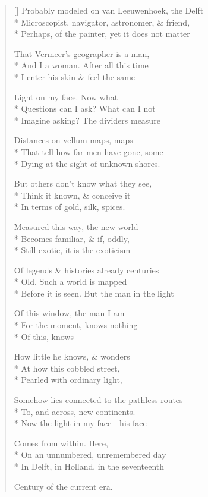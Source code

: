 \label{ch:the_geographer}
\settowidth{\versewidth}{Perhaps, of the painter, yet it does not matter}
\begin{verse}[\versewidth]
Probably modeled on van Leeuwenhoek, the Delft\\*
Microscopist, navigator, astronomer, \& friend,\\*
Perhaps, of the painter, yet it does not matter

That Vermeer's geographer is a man,\\*
And I a woman. After all this time\\*
I enter his skin \& feel the same

Light on my face. Now what\\*
Questions can I ask? What can I not\\*
Imagine asking? The dividers measure

Distances on vellum maps, maps \\*
That tell how far men have gone, some\\*
Dying at the sight of unknown shores.

But others don't know what they see,\\*
Think it known, \& conceive it\\*
In terms of gold, silk, spices.

Measured this way, the new world\\*
Becomes familiar, \& if, oddly,\\*
Still exotic, it is the exoticism

Of legends \& histories already centuries\\*
Old.  Such a world is mapped\\*
Before it is seen. But the man in the light

Of this window, the man I am\\*
For the moment, knows nothing\\*
Of this, knows

How little he knows, \& wonders\\*
At how this cobbled street, \\*
Pearled with ordinary light,

Somehow lies connected to the pathless routes\\*
To, and across, new continents.\\*
Now the light in my face---his face---

Comes from within. Here,\\*
On an unnumbered, unremembered day\\*
In Delft, in Holland, in the seventeenth

Century of the current era.
\end{verse}
